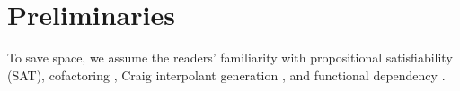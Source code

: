 \documentclass[journal]{IEEEtran}
\begin{document}
%
%
%
%
%

\section{Preliminaries}\label{sec_prem}

To save space,
we assume the readers' familiarity with propositional satisfiability (SAT),
cofactoring \cite{Cofact},
Craig interpolant generation \cite{interp_McMillan},
and functional dependency \cite{funcdep}.
\end{document}

